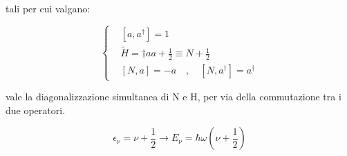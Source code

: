 \documentclass{article}
\begin{document}
tali per cui valgano:

\begin{equation}
  \left\{
  \begin{aligned}
     & [a,a^{\dagger}]=1                                    \\
     & \tilde{H}=\dagger aa+\frac{1}{2}\equiv N+\frac{1}{2} \\
     & [N,a]=-a \quad , \quad [N,a^{\dagger}]=a^{\dagger}
  \end{aligned}
  \right.
\end{equation}

vale la diagonalizzazione simultanea di N e H, per via della commutazione tra i due operatori.

\begin{equation}
  \epsilon_\nu=\nu+\frac{1}{2} \rightarrow E_\nu=\hbar \omega(\nu+\frac{1}{2})
\end{equation}
\end{document}
